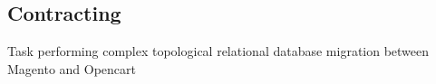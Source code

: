\documentclass[10pt,a4paper,sans]{moderncv}        %
\begin{document}
\subsection{Contracting}
    {Task performing complex topological relational database migration between Magento and
    Opencart}
%
%
%
%
%
%
%
%
\end{document}

